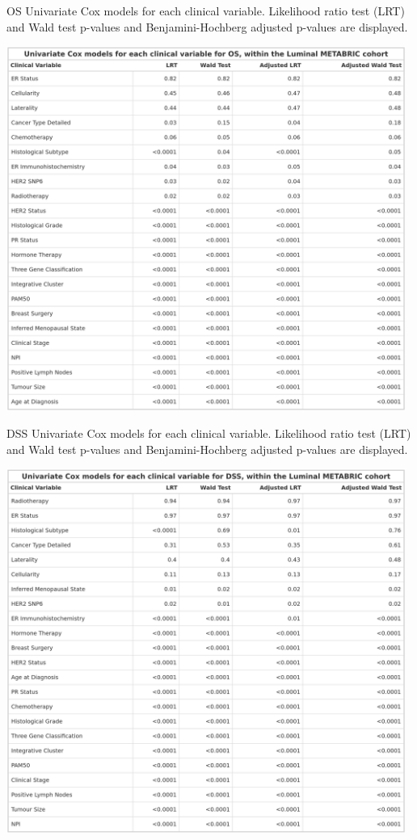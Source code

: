 \vfill
\begin{table}[!h]
\caption[OS Univariate Cox models for each clinical variable.]{OS Univariate Cox models for each clinical variable. Likelihood ratio test (LRT) and Wald test p-values and Benjamini-Hochberg adjusted p-values are displayed.}
\includegraphics[width=0.98\textwidth]{../tables/Chapter_3/Luminal_Survival_Association_OS.png}
\label{tab:Surv_Tests_OS}
\end{table}
\vfill
\clearpage
\begin{table}[!ht]
\caption[DSS Univariate Cox models for each clinical variable.]{DSS Univariate Cox models for each clinical variable. Likelihood ratio test (LRT) and Wald test p-values and Benjamini-Hochberg adjusted p-values are displayed.}
\includegraphics[width=0.98\textwidth]{../tables/Chapter_3/Luminal_Survival_Association_DSS.png}
\label{tab:Surv_Tests_DSS}
\end{table}

